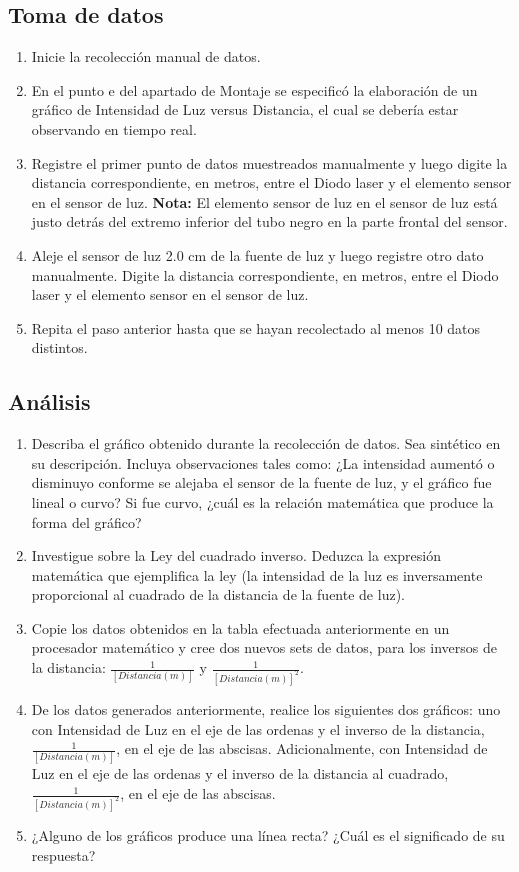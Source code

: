 \documentclass[12pt,letterpaper]{report}
\begin{document}
\subsection{Toma de datos}
\begin{enumerate}
    \item Inicie la recolección manual de datos. 
    \item En el punto e del apartado de Montaje se especificó la elaboración de un gráfico de Intensidad de Luz versus Distancia, el cual se debería estar observando en tiempo real.
    \item Registre el primer punto de datos muestreados manualmente y luego digite la distancia correspondiente, en metros, entre el Diodo laser y el elemento sensor en el sensor de luz. \textbf{Nota:} El elemento sensor de luz en el sensor de luz está justo detrás del extremo inferior del tubo negro en la parte frontal del sensor.
    \item Aleje el sensor de luz 2.0 cm de la fuente de luz y luego registre otro dato manualmente. Digite la distancia correspondiente, en metros, entre el Diodo laser y el elemento sensor en el sensor de luz.
    \item Repita el paso anterior hasta que se hayan recolectado al menos 10 datos distintos.
\end{enumerate}

\subsection{Análisis}
\begin{enumerate}
    \item Describa el gráfico obtenido durante la recolección de datos. Sea sintético en su descripción. Incluya observaciones tales como: ¿La intensidad aumentó o disminuyo conforme se alejaba el sensor de la fuente de luz, y el gráfico fue lineal o curvo? Si fue curvo, ¿cuál es la relación matemática que produce la forma del gráfico?
    \item Investigue sobre la Ley del cuadrado inverso. Deduzca la expresión matemática que ejemplifica la ley (la intensidad de la luz es inversamente proporcional al cuadrado de la distancia de la fuente de luz).
    \item Copie los datos obtenidos en la tabla efectuada anteriormente en un procesador matemático y cree dos nuevos sets de datos, para los inversos de la distancia: $\frac{1}{[Distancia(m)]}$ y $\frac{1}{[Distancia(m)]^2}$.
    \item De los datos generados anteriormente, realice los siguientes dos gráficos: uno con Intensidad de Luz en el eje de las ordenas y el inverso de la distancia, $\frac{1}{[Distancia(m)]}$, en el eje de las abscisas. Adicionalmente, con Intensidad de Luz en el eje de las ordenas y el inverso de la distancia al cuadrado, $\frac{1}{[Distancia(m)]^2}$, en el eje de las abscisas.
    \item ¿Alguno de los gráficos produce una línea recta? ¿Cuál es el significado de su respuesta?
\end{enumerate}
\end{document}
